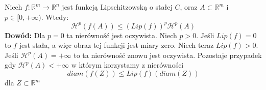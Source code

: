 \begin{lem}
	Niech $f: \mathbb{R}^m \rightarrow \mathbb{R}^n$ jest funkcją Lipschitzowską o stałej $C$, oraz $A \subset \mathbb{R}^m$ i $p \in [0, + \infty)$. Wtedy: $$
		\mathcal{H}^p(f(A)) \leq (Lip(f))^p \mathcal{H}^p(A)
	$$
	\textbf{Dowód:}\newline
	Dla $p=0$ ta nierówność jest oczywista. Niech $p>0$. Jeśli $Lip(f) = 0$ to $f$ jest stała, a więc obraz tej funkcji jest miary zero. Niech teraz $Lip(f)>0$. Jeśli $\mathcal{H}^p(A) = +\infty$ to ta nierówność znowu jest oczywista. Pozostaje przypadek gdy $\mathcal{H}^p(A) < +\infty$ w którym korzystamy z nierówności $$
		diam(f(Z)) \leq Lip(f)(diam(Z))
	$$
	dla $Z \subset \mathbb{R}^m$ 
\end{lem}